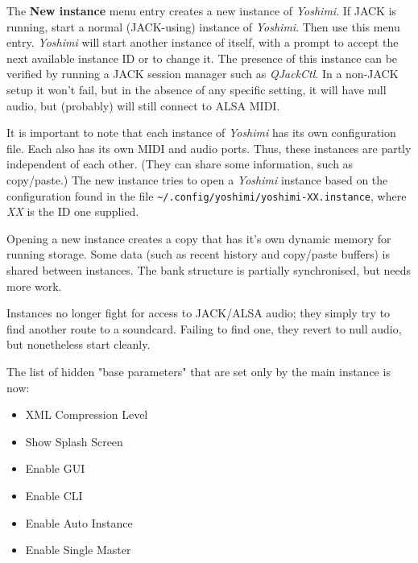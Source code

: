    The \textbf{New instance} menu entry creates a new instance of
   \textsl{Yoshimi}.  If JACK is running, start a normal (JACK-using) instance
   of \textsl{Yoshimi}.  Then use this menu entry.  \textsl{Yoshimi} will start
   another instance of itself, with a prompt to accept the next available
   instance ID or to change it.  The presence of this instance can be verified
   by running a JACK session manager such as \textsl{QJackCtl}.
   In a non-JACK setup it won't fail, but in the absence of any specific
   setting, it will have null audio, but (probably) will still connect to ALSA
   MIDI.

   It is important to note that each instance of \textsl{Yoshimi} has its
   own configuration file.  Each also has its own MIDI and audio ports.
   Thus, these instances are partly independent of each other.
   (They can share some information, such as copy/paste.)
   The new instance tries to open a \textsl{Yoshimi} instance based on the
   configuration found in the file
   \texttt{\textasciitilde/.config/\-yoshimi/\-yoshimi-XX.instance}, where
   \textsl{XX} is the ID one supplied.

   Opening a new instance creates a copy that has it's own dynamic memory for
   running storage. Some data (such as recent history and copy/paste buffers) is
   shared between instances.
   The bank structure is partially synchronised, but needs more work.


   Instances no longer fight for access to JACK/ALSA audio; they simply
   try to find another route to a soundcard. Failing to find one,
   they revert to null audio, but nonetheless start cleanly.

   The list of hidden "base parameters" that are set only by the main instance
   is now:

   \begin{itemize}
      \item XML Compression Level
      \item Show Splash Screen
      \item Enable GUI
      \item Enable CLI
      \item Enable Auto Instance
      \item Enable Single Master
   \end{itemize}

